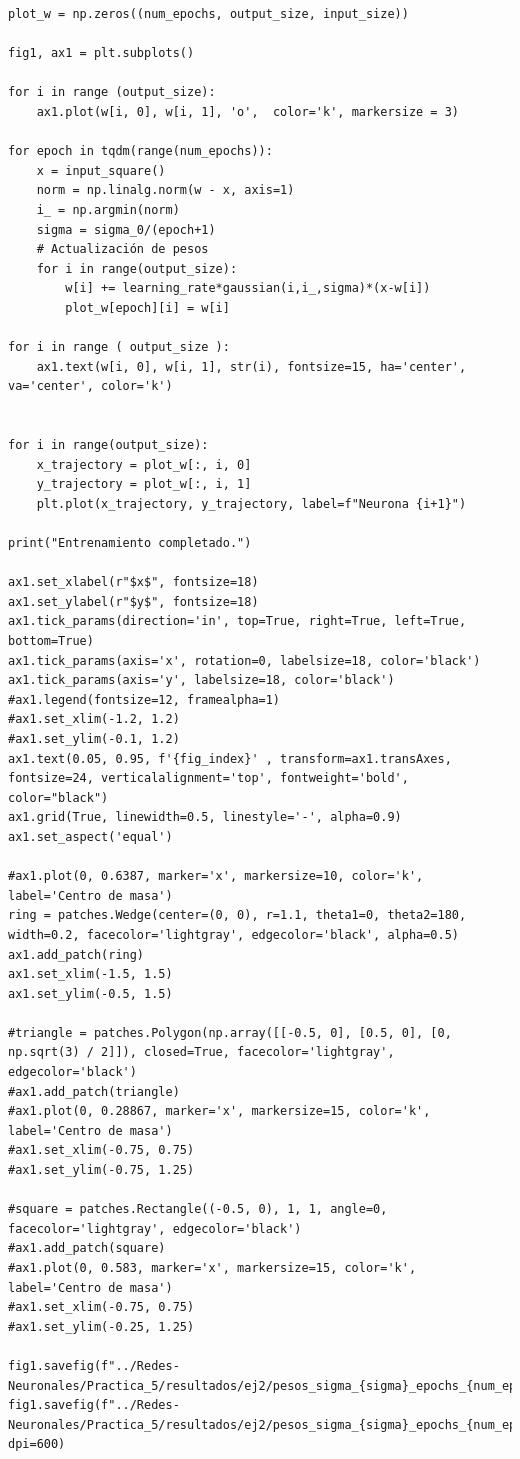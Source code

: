 \documentclass[11pt,twocolumn,twoside]{opticajnl}
\begin{document}
\begin{onecolumn}
\begin{lstlisting}[style=mystyle]
plot_w = np.zeros((num_epochs, output_size, input_size))

fig1, ax1 = plt.subplots()

for i in range (output_size):
    ax1.plot(w[i, 0], w[i, 1], 'o',  color='k', markersize = 3)

for epoch in tqdm(range(num_epochs)):
    x = input_square()
    norm = np.linalg.norm(w - x, axis=1)
    i_ = np.argmin(norm)
    sigma = sigma_0/(epoch+1)
    # Actualización de pesos
    for i in range(output_size):
        w[i] += learning_rate*gaussian(i,i_,sigma)*(x-w[i])
        plot_w[epoch][i] = w[i]

for i in range ( output_size ):
    ax1.text(w[i, 0], w[i, 1], str(i), fontsize=15, ha='center', va='center', color='k')


for i in range(output_size):
    x_trajectory = plot_w[:, i, 0]
    y_trajectory = plot_w[:, i, 1]
    plt.plot(x_trajectory, y_trajectory, label=f"Neurona {i+1}")

print("Entrenamiento completado.")

ax1.set_xlabel(r"$x$", fontsize=18)
ax1.set_ylabel(r"$y$", fontsize=18)
ax1.tick_params(direction='in', top=True, right=True, left=True, bottom=True)
ax1.tick_params(axis='x', rotation=0, labelsize=18, color='black')
ax1.tick_params(axis='y', labelsize=18, color='black')
#ax1.legend(fontsize=12, framealpha=1)
#ax1.set_xlim(-1.2, 1.2)
#ax1.set_ylim(-0.1, 1.2)
ax1.text(0.05, 0.95, f'{fig_index}' , transform=ax1.transAxes, fontsize=24, verticalalignment='top', fontweight='bold', color="black")
ax1.grid(True, linewidth=0.5, linestyle='-', alpha=0.9)
ax1.set_aspect('equal')

#ax1.plot(0, 0.6387, marker='x', markersize=10, color='k', label='Centro de masa')
ring = patches.Wedge(center=(0, 0), r=1.1, theta1=0, theta2=180, width=0.2, facecolor='lightgray', edgecolor='black', alpha=0.5)
ax1.add_patch(ring)
ax1.set_xlim(-1.5, 1.5)
ax1.set_ylim(-0.5, 1.5)

#triangle = patches.Polygon(np.array([[-0.5, 0], [0.5, 0], [0, np.sqrt(3) / 2]]), closed=True, facecolor='lightgray', edgecolor='black')
#ax1.add_patch(triangle)
#ax1.plot(0, 0.28867, marker='x', markersize=15, color='k', label='Centro de masa')
#ax1.set_xlim(-0.75, 0.75)
#ax1.set_ylim(-0.75, 1.25)

#square = patches.Rectangle((-0.5, 0), 1, 1, angle=0, facecolor='lightgray', edgecolor='black')
#ax1.add_patch(square)
#ax1.plot(0, 0.583, marker='x', markersize=15, color='k', label='Centro de masa')
#ax1.set_xlim(-0.75, 0.75)
#ax1.set_ylim(-0.25, 1.25)

fig1.savefig(f"../Redes-Neuronales/Practica_5/resultados/ej2/pesos_sigma_{sigma}_epochs_{num_epochs}_lr_{learning_rate}.pdf")
fig1.savefig(f"../Redes-Neuronales/Practica_5/resultados/ej2/pesos_sigma_{sigma}_epochs_{num_epochs}_lr_{learning_rate}.png", dpi=600)

\end{lstlisting}

\end{onecolumn}
\end{document}
